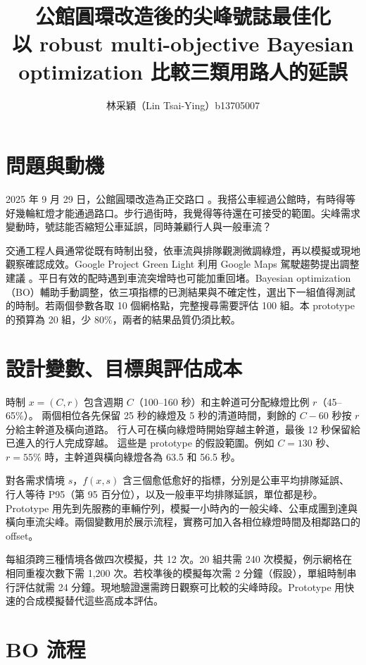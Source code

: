 \documentclass[10pt,a4paper]{article}
\title{公館圓環改造後的尖峰號誌最佳化\\
\large 以 robust multi-objective Bayesian optimization 比較三類用路人的延誤}
\author{林采穎（Lin Tsai-Ying）\quad b13705007\quad {\small\href{https://github.com/tsai0120/gongguan-signal-bo}{\texttt{github.com/tsai0120/gongguan-signal-bo}}}}
\date{}
\begin{document}
\maketitle
\vspace{-7mm}

\section{問題與動機}

2025 年 9 月 29 日，公館圓環改造為正交路口 \cite{taipei}。我搭公車經過公館時，有時得等好幾輪紅燈才能通過路口。步行過街時，我覺得等待還在可接受的範圍。尖峰需求變動時，號誌能否縮短公車延誤，同時兼顧行人與一般車流？

交通工程人員通常從既有時制出發，依車流與排隊觀測微調綠燈，再以模擬或現地觀察確認成效。Google Project Green Light 利用 Google Maps 駕駛趨勢提出調整建議 \cite{greenlight}。平日有效的配時遇到車流突增時也可能加重回堵。Bayesian optimization（BO）輔助手動調整，依三項指標的已測結果與不確定性，選出下一組值得測試的時制。若兩個參數各取 10 個網格點，完整搜尋需要評估 100 組。本 prototype 的預算為 20 組，少 80\%，兩者的結果品質仍須比較。

\section{設計變數、目標與評估成本}

時制 $x=(C,r)$ 包含週期 $C$（100--160 秒）和主幹道可分配綠燈比例 $r$（45--65\%）。
兩個相位各先保留 25 秒的綠燈及 5 秒的清道時間，剩餘的 $C-60$ 秒按 $r$ 分給主幹道及橫向道路。
行人可在橫向綠燈時開始穿越主幹道，最後 12 秒保留給已進入的行人完成穿越。
這些是 prototype 的假設範圍。例如 $C=130$ 秒、$r=55\%$ 時，主幹道與橫向綠燈各為 63.5 和 56.5 秒。

對各需求情境 $s$，$f(x,s)$ 含三個愈低愈好的指標，分別是公車平均排隊延誤、
行人等待 P95（第 95 百分位），以及一般車平均排隊延誤，單位都是秒。
Prototype 用先到先服務的車輛佇列，模擬一小時內的一般尖峰、公車成團到達與橫向車流尖峰。兩個變數用於展示流程，實務可加入各相位綠燈時間及相鄰路口的 offset。

每組須跨三種情境各做四次模擬，共 12 次。20 組共需 240 次模擬，例示網格在相同重複次數下需 1,200 次。若校準後的模擬每次需 2 分鐘（假設），單組時制串行評估就需 24 分鐘。現地驗證還需跨日觀察可比較的尖峰時段。Prototype 用快速的合成模擬替代這些高成本評估。

\section{BO 流程}
\end{document}
